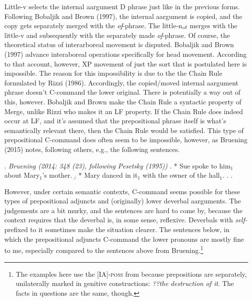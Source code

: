 \documentclass[12pt]{article}
\newcommand*{\textsub}[1]{\ensuremath{_\textrm{{\scriptsize #1}}}}
\begin{document}
\vspace*{-85pt}

\doublespacing

\noindent Little-v selects the internal aargument D phrase just like in the previous forms. Following Bobaljik and Brown (1997), the internal aargument is copied, and the copy gets separately merged with the \textit{of}-phrase. The little-n\textsub{of} merges with the little-v and subsequently with the separately made \textit{of}-phrase. Of course, the theoretical status of interarboreal movement is disputed. Bobaljik and Brown (1997) advance interaboreal operations specifically for head movement. According to that account, however, XP movement of just the sort that is postulated here is impossible. The reason for this impossibility is due to the the Chain Rule formulated by Rizzi (1986). Accordingly, the copied/moved internal aargument phrase doesn't C-command the lower original. There is potentially a way out of this, however. Bobaljik and Brown make the Chain Rule a syntactic property of Merge, unlike Rizzi who makes it an LF property. If the Chain Rule does indeed occur at LF, and it's assumed that the prepositional phrase itself is what's semantically relevant there, then the Chain Rule would be satisfied. This type of prepositional C-command does often seem to be impossible, however, as Bruening (2015) notes, following others, e.g., the following sentences.

\singlespacing

\ex. \textit{Bruening (2014: 348 (23), following Pesetsky (1995))}
\a. * Sue spoke to him$_1$ about Mary$_1$'s mother.
\b. * Mary danced in it$_1$ with the owner of the hall$_1$.
\z. \z. \par

\doublespacing

However, under certain semantic contexts, C-command seems possible for these types of prepositional adjuncts and (originally) lower deverbal aarguments. The judgements are a bit murky, and the sentences are hard to come by, because the context requires that the deverbal is, in some sense, reflexive. Deverbals with \textit{self-} prefixed to it sometimes make the situation clearer. The sentences below, in which the prepositional adjuncts C-command the lower pronouns are mostly fine to me, especially compared to the sentences above from Bruening.\footnote{ The examples here use the [IA]-\textsc{poss} from because prepositions are separately, unilaterally marked in genitive constructions: \textit{??the destruction of it}. The facts in questions are the same, though.}
\end{document}
